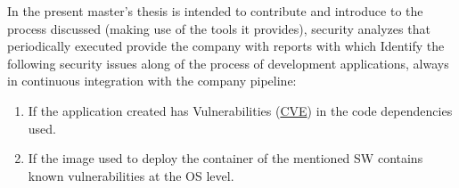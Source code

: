 In the present master's thesis is intended to contribute and introduce to the process discussed (making use of the tools it provides), security analyzes that periodically executed provide the company with reports with which Identify the following security issues along of the process of development applications, always in continuous integration with the company pipeline:

\begin{enumerate}
\item If the application created has Vulnerabilities (\href{https://cve.mitre.org/}{\gls{CVE}}) in the code dependencies used.
\item If the image used to deploy the container of the mentioned \gls{SW} contains known vulnerabilities at the \gls{OS} level.
\end{enumerate}

